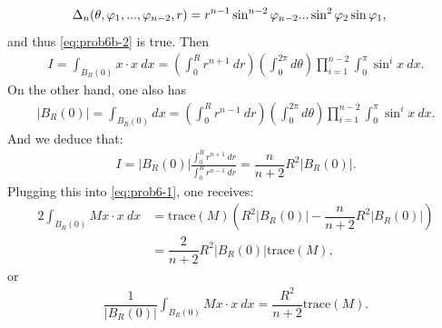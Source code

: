 \begin{problem}
\begin{solution}
\begin{itemize}
\begin{align*}
        \Delta_{n} (\theta,\varphi_1,...,\varphi_{n-2},r) &= r^{n-1} \sin^{n-2}\varphi_{n-2}...\sin^2 \varphi_2 \sin \varphi_1,
    \end{align*}
    and thus \eqref{eq:prob6b-2} is true. Then 
    \begin{align*}
        I = \displaystyle\int_{B_R(0)} x\cdot x\ dx =  \left(\displaystyle\int_0^R r^{n+1}\ dr \right) \left( \displaystyle\int_0^{2\pi} d\theta \right) \displaystyle\prod\limits_{i=1}^{n-2} \displaystyle\int_0^{\pi} \sin^{i} x \ dx.
    \end{align*}
    On the other hand, one also has 
    \begin{align*}
        \left| B_R(0) \right| = \displaystyle\int_{B_R(0)} dx = \left(\displaystyle\int_0^R r^{n-1}\ dr \right) \left( \displaystyle\int_0^{2\pi} d\theta \right) \displaystyle\prod\limits_{i=1}^{n-2} \displaystyle\int_0^{\pi} \sin^{i} x \ dx.
    \end{align*}
    And we deduce that:
    \begin{align*}
        I = |B_R(0)| \frac{\displaystyle\int_0^R r^{n+1}\ dr}{\displaystyle\int_0^R r^{n-1}\ dr} = \dfrac{n}{n+2} R^2 |B_R(0)|.
    \end{align*}
    Plugging this into \eqref{eq:prob6-1}, one receives:
    \begin{align*}
    2 \displaystyle\int_{B_R(0)} Mx \cdot x \ dx &= \mathrm{trace}(M) \left( R^2 |B_R(0)| - \dfrac{n}{n+2}R^2 |B_R(0)| \right) \\
    &= \dfrac{2}{n+2} R^2 |B_R(0)|\mathrm{trace}(M),
    \end{align*}
    or 
    \begin{align*}
    \dfrac{1}{|B_R(0)|}\displaystyle\int_{B_R(0)} Mx \cdot x \ dx = \dfrac{R^2}{n+2}\mathrm{trace}(M).
    \end{align*}
\end{itemize}
\end{solution}
\end{problem}

